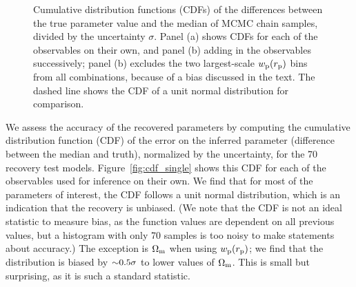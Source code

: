 \begin{figure}%
\centering
{}
\hspace{0.06\textwidth}
\caption{Cumulative distribution functions (CDFs) of the differences between the true parameter value and the median of MCMC chain samples, divided by the uncertainty $\sigma$. Panel (a) shows CDFs for each of the observables on their own, and panel (b) adding in the observables successively; panel (b) excludes the two largest-scale $w_\mathrm{p}(r_\mathrm{p})$ bins from all combinations, because of a bias discussed in the text. The dashed line shows the CDF of a unit normal distribution for comparison.}
\label{fig:cdf}
\end{figure}

We assess the accuracy of the recovered parameters by computing the cumulative distribution function (CDF) of the error on the inferred parameter (difference between the median and truth), normalized by the uncertainty, for the 70 recovery test models.
Figure~\ref{fig:cdf_single} shows this CDF for each of the observables used for inference on their own.
We find that for most of the parameters of interest, the CDF follows a unit normal distribution, which is an indication that the recovery is unbiased.
(We note that the CDF is not an ideal statistic to measure bias, as the function values are dependent on all previous values, but a histogram with only 70 samples is too noisy to make statements about accuracy.)
The exception is $\Omega_\mathrm{m}$ when using $w_\mathrm{p}(r_\mathrm{p})$; we find that the distribution is biased by $\mathord{\sim}0.5\sigma$ to lower values of $\Omega_\mathrm{m}$.
This is small but surprising, as it is such a standard statistic.

